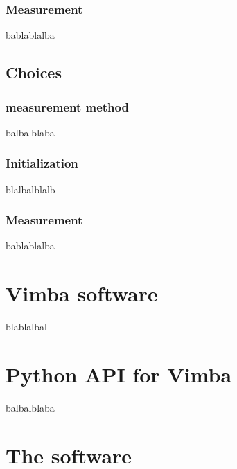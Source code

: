 \subsubsection{Measurement}
bablablalba
\subsection{Choices}
\subsubsection{measurement method}
balbalblaba
\subsubsection{Initialization}
blalbalblalb
\subsubsection{Measurement}
bablablalba
\section{Vimba software}\label{sec:Vimba}
blablalbal
\section{Python API for Vimba}
balbalblaba
\section{The software}
